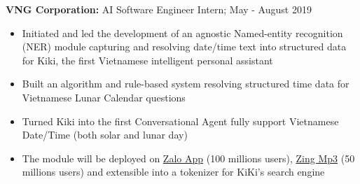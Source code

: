 \documentclass[a4paper,11pt]{article}
\begin{document}
\begin{flushleft}
	\textbf{VNG Corporation: } AI Software Engineer Intern; May - August 2019 \\
	\vspace{-\topsep}
	\begin{itemize}
		\setlength{\parskip}{0pt}
		\setlength{\itemsep}{0pt plus 1pt}
		\item Initiated and led the development of an agnostic Named-entity recognition (NER) module capturing and resolving date/time text into structured data for Kiki, the first Vietnamese intelligent personal assistant
		\item Built an algorithm and rule-based system resolving structured time data for Vietnamese Lunar Calendar questions  
		\item Turned Kiki into the first Conversational Agent fully support Vietnamese Date/Time (both solar and lunar day) 
		\item  The module will be deployed on  \href{https://oa.zalo.me/home}{Zalo App} (100 millions users),  \href{https://mp3.zing.vn/}{Zing Mp3} (50 millions users) and extensible into a tokenizer for KiKi's search engine
	\end{itemize}
\vspace{-\topsep}
\centering{\noindent\makebox{\rule{8cm}{1.5pt}}}
\end{flushleft} 
\end{document}
